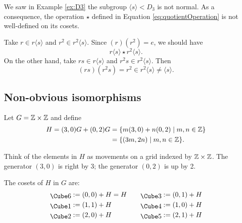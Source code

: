 \documentclass[../algebraNotesMSRI-UP2016.tex]{subfiles}
\begin{document}
\begin{frame}[c]
We saw in Example \ref{ex:D3} the subgroup $\langle s\rangle< D_3$ is not normal.  As a consequence, the operation $\star$ defined in Equation \eqref{eq:quotientOperation} is not well-defined on its cosets.

\smallGap
Take $r\in r\langle s\rangle$ and $r^2\in r^2\langle s\rangle$.  Since $(r)(r^2)=e$, we should have 
\[
r\langle s\rangle \star r^2\langle s\rangle.
\]
On the other hand, take $rs\in r\langle s\rangle$ and $r^2s\in r^2\langle s\rangle$.  Then 
\[
(rs)(r^2s)=r^2\in r^2\langle s\rangle\neq \langle s\rangle.
\]
\end{frame}

\subsection[\subsecname]{Non-obvious isomorphisms}
\begin{frame}{\subsecname}
\begin{ex}\label{ex:isoToZ6}
Let $G=\mathbb Z\times \mathbb Z$ and define 
\begin{align*}
H=(3,0)G+(0,2)G &= \{m(3,0)+n(0,2)\mid m,n\in \mathbb Z\} \\
	&= \{(3m,2n)\mid m,n\in \mathbb Z\}.
\end{align*}
\end{ex}
Think of the elements in $H$ as movements on a grid indexed by $\mathbb Z\times \mathbb Z$.  The generator $(3,0)$ is right by 3; the generator $(0,2)$ is up by 2.  

\smallGap 
The cosets of $H$ in $G$ are: 
\smallGap
\[
\begin{aligned}
\die{6} &:=(0,0)+H=H \\
\die{1} &:=(1,1)+H \\
\die{2} &:=(2,0)+H
\end{aligned} \qquad	
\begin{aligned}
\die{3} &:=(0,1)+H \\
\die{4} &:=(1,0)+H \\
\die{5} &:=(2,1)+H
\end{aligned}
\]
\end{frame}
\end{document}
